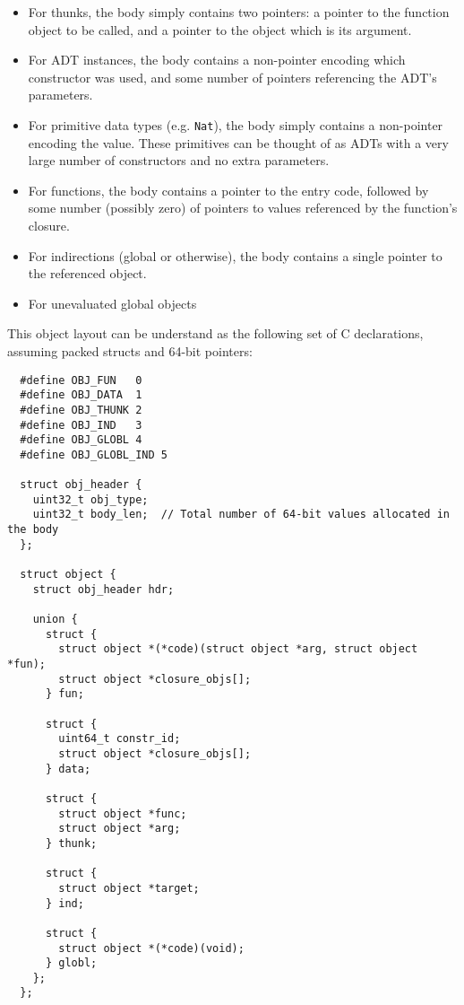 \documentclass[9pt]{extarticle}
\begin{document}
\begin{itemize}
  \item For thunks, the body simply contains two pointers: a pointer to
    the function object to be called, and a pointer to the object which
    is its argument.

  \item For ADT instances, the body contains a non-pointer encoding
    which constructor was used, and some number of pointers referencing
    the ADT's parameters.

  \item For primitive data types (e.g. \verb'Nat'), the body simply
    contains a non-pointer encoding the value. These primitives can be
    thought of as ADTs with a very large number of constructors and no
    extra parameters.

  \item For functions, the body contains a pointer to the entry code,
    followed by some number (possibly zero) of pointers to values
    referenced by the function's closure.

  \item For indirections (global or otherwise), the body contains a
    single pointer to the referenced object.

  \item For unevaluated global objects
\end{itemize}

This object layout can be understand as the following set of C
declarations, assuming packed structs and 64-bit pointers:

\begin{verbatim}
  #define OBJ_FUN   0
  #define OBJ_DATA  1
  #define OBJ_THUNK 2
  #define OBJ_IND   3
  #define OBJ_GLOBL 4
  #define OBJ_GLOBL_IND 5

  struct obj_header {
    uint32_t obj_type;
    uint32_t body_len;  // Total number of 64-bit values allocated in the body
  };

  struct object {
    struct obj_header hdr;

    union {
      struct {
        struct object *(*code)(struct object *arg, struct object *fun);
        struct object *closure_objs[];
      } fun;

      struct {
        uint64_t constr_id;
        struct object *closure_objs[];
      } data;

      struct {
        struct object *func;
        struct object *arg;
      } thunk;

      struct {
        struct object *target;
      } ind;

      struct {
        struct object *(*code)(void);
      } globl;
    };
  };
\end{verbatim}
\end{document}
